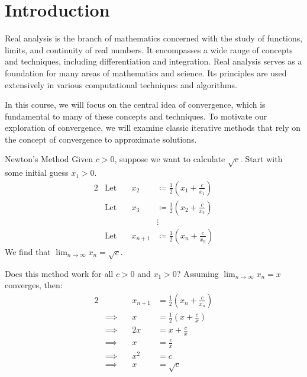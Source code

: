 \chapter{Introduction}



Real analysis is the branch of mathematics concerned with the study of functions, limits, and continuity of real numbers. It encompasses a wide range of concepts and techniques, including differentiation and integration. Real analysis serves as a foundation for many areas of mathematics and science. Its principles are used extensively in various computational techniques and algorithms.

In this course, we will focus on the central idea of convergence, which is fundamental to many of these concepts and techniques. To motivate our exploration of convergence, we will examine classic iterative methods that rely on the concept of convergence to approximate solutions.

\begin{exbox}{Newton's Method}{}
    Given $c > 0$, suppose we want to calculate $\sqrt{c}$. Start with some initial guess $x_1 > 0$.
    \begin{alignat*}{2}
        & \text{Let}\quad & x_2 &\coloneq \frac{1}{2} \left( x_1 + \frac{c}{x_1} \right) \\
        & \text{Let}\quad & x_3 &\coloneq \frac{1}{2} \left( x_2 + \frac{c}{x_2} \right) \\
        && &\vdots \\
        & \text{Let}\quad & x_{n+1} &\coloneq \frac{1}{2} \left( x_n + \frac{c}{x_n} \right)
    \end{alignat*}
    We find that $\lim_{n\to\infty} x_n = \sqrt{c}$.
\end{exbox}

Does this method work for all $c > 0$ and $x_1 > 0$? Assuming $\lim_{n\to\infty} x_n = x$ converges, then:
\begin{alignat*}{2}
    && x_{n+1} &= \frac{1}{2} \left( x_n + \frac{c}{x_n} \right) \\
    &\implies \quad &x &= \frac{1}{2} \left( x + \frac{c}{x} \right) \\
    &\implies &2x &= x + \frac{c}{x} \\
    &\implies &x &= \frac{c}{x} \\
    &\implies &x^2 &= c \\
    &\implies &x &= \sqrt{c}
\end{alignat*}

